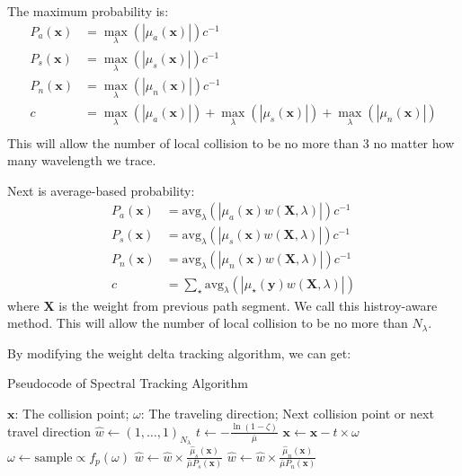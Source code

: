 \documentclass[acmtog]{acmart}
\begin{document}
The maximum probability is:
\begin{equation}
	\begin{aligned}
		P_a(\mathbf x)&=\max_{\lambda}(|\mu_a(\mathbf x)|)c^{-1}\\
		P_s(\mathbf x)&=\max_{\lambda}(|\mu_s(\mathbf x)|)c^{-1}\\
		P_n(\mathbf x)&=\max_{\lambda}(|\mu_n(\mathbf x)|)c^{-1}\\
		c&=\max_{\lambda}(|\mu_a(\mathbf x)|)+\max_{\lambda}(|\mu_s(\mathbf x)|)+\max_{\lambda}(|\mu_n(\mathbf x)|)\\
	\end{aligned}
\end{equation}
This will allow the number of local collision to be no more than 3 no matter how many wavelength we trace.

Next is average-based probability:
\begin{equation}
	\begin{aligned}
		P_a(\mathbf x)&=\mathrm {avg}_{\lambda}(|\mu_a(\mathbf x)w(\mathbf X,\lambda)|)c^{-1}\\
		P_s(\mathbf x)&=\mathrm {avg}_{\lambda}(|\mu_s(\mathbf x)w(\mathbf X,\lambda)|)c^{-1}\\
		P_n(\mathbf x)&=\mathrm {avg}_{\lambda}(|\mu_n(\mathbf x)w(\mathbf X,\lambda)|)c^{-1}\\
		c&=\sum_{\star}\mathrm {avg}_{\lambda}(|\mu_\star(\mathbf y)w(\mathbf X,\lambda)|)
	\end{aligned}
\end{equation}
where $\mathbf X$ is the weight from previous path segment.
We call this histroy-aware method.
This will allow the number of local collision to be no more than $N_{\lambda}$.

By modifying the weight delta tracking algorithm, we can get:
\begin{algorithm}[H]
	\caption{Pseudocode of Spectral Tracking Algorithm}
	\begin{algorithmic}[1]
		\Require
			$\mathbf x$: The collision point; $\omega$: The traveling direction;
		\Ensure
			Next collision point or next travel direction
			\State $\hat w\gets(1,\dots,1)_{N_{\lambda}}$
				\State $t\gets-\frac{\ln(1-\zeta)}{\bar\mu}$
				\State $\mathbf x\gets\mathbf x-t\times\omega$
					\State {}
					\State $\omega\gets\mathrm{sample}\propto f_p(\omega)$
					\State $\hat w\gets \hat w\times \frac{\hat\mu_s(\mathbf x)}{\bar\mu P_s(\mathbf x)}$
				\Else {}
					\State $\hat w\gets \hat w\times \frac{\hat\mu_n(\mathbf x)}{\bar\mu P_n(\mathbf x)}$
				\EndIf
			\EndWhile
	\end{algorithmic}
\end{algorithm}
\end{document}
